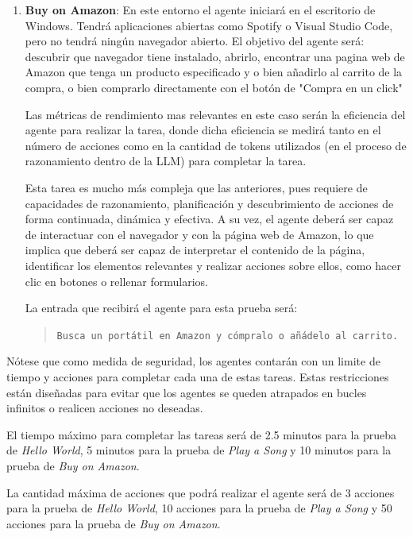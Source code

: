 \begin{enumerate}
  \item \textbf{Buy on Amazon}: En este entorno el agente iniciará
  en el escritorio de Windows. Tendrá aplicaciones abiertas como
  Spotify o Visual Studio Code, pero no tendrá ningún navegador abierto.
  El objetivo del agente será: descubrir que navegador tiene instalado,
  abrirlo, encontrar una pagina web de Amazon que tenga un producto
  especificado y o bien añadirlo al carrito de la compra, o bien
  comprarlo directamente con el botón de "Compra en un click"

  Las métricas de rendimiento mas relevantes en este caso serán 
  la eficiencia del agente para realizar la tarea, donde dicha eficiencia
  se medirá tanto en el número de acciones como en la cantidad de tokens
  utilizados (en el proceso de razonamiento dentro de la LLM) para completar
  la tarea. 

  Esta tarea es mucho más compleja que las anteriores, pues
  requiere de capacidades de razonamiento, planificación y descubrimiento
  de acciones de forma continuada, dinámica y efectiva.
  A su vez, el agente deberá ser capaz de interactuar con el navegador
  y con la página web de Amazon, lo que implica que deberá ser capaz
  de interpretar el contenido de la página, identificar los elementos
  relevantes y realizar acciones sobre ellos, como hacer clic en botones
  o rellenar formularios.

  La entrada que recibirá el agente para esta prueba será:
  \begin{quote}
    \texttt{Busca un portátil en Amazon y cómpralo o añádelo al carrito.}
  \end{quote}

\end{enumerate}

Nótese que como medida de seguridad, los agentes contarán con un limite
de tiempo y acciones para completar cada una de estas tareas. Estas
restricciones están diseñadas para evitar que los agentes se queden
atrapados en bucles infinitos o realicen acciones no deseadas.

El tiempo máximo para completar las tareas será de 2.5 minutos para la prueba
de \emph{Hello World}, 5 minutos para la prueba de \emph{Play a Song} y
10 minutos para la prueba de \emph{Buy on Amazon}.

La cantidad máxima de acciones que podrá realizar el agente
será de 3 acciones para la prueba de \emph{Hello World}, 10 acciones
para la prueba de \emph{Play a Song} y 50 acciones para la prueba de
\emph{Buy on Amazon}.

